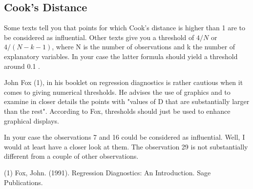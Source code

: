 \documentclass[Main.tex]{subfiles}
\begin{document}
	\newpage
	
	
	\subsection{Cook's Distance}
	Some texts tell you that points for which Cook's distance is higher than 1 are to be considered as influential. Other texts give you a threshold of $4/N$ or $4/(N−k−1)$, where N is the number of observations and k the number of explanatory variables. In your case the latter formula should yield a threshold around 0.1 .
	
	John Fox (1), in his booklet on regression diagnostics is rather cautious when it comes to giving numerical thresholds. He advises the use of graphics and to examine in closer details the points with "values of D that are substantially larger than the rest". According to Fox, thresholds should just be used to enhance graphical displays.
	
	In your case the observations 7 and 16 could be considered as influential. Well, I would at least have a closer look at them. The observation 29 is not substantially different from a couple of other observations.
	
	(1) Fox, John. (1991). Regression Diagnostics: An Introduction. Sage Publications.

\end{document}
